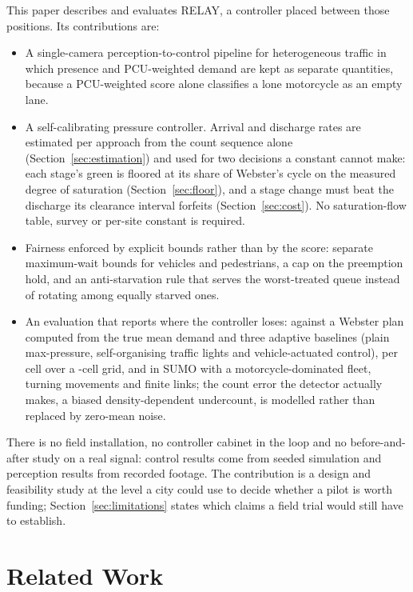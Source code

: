 \documentclass[journal]{IEEEtran}
\newcommand{\relay}{RELAY}
\newcommand{\pcu}{PCU}
\begin{document}
This paper describes and evaluates \relay, a controller placed between those positions. Its contributions are:
\begin{itemize}
\item A single-camera perception-to-control pipeline for heterogeneous traffic in which presence and
\pcu-weighted demand are kept as separate quantities, because a \pcu-weighted score alone classifies a lone
motorcycle as an empty lane.
\item A self-calibrating pressure controller. Arrival and discharge rates are estimated per approach from the
count sequence alone (Section~\ref{sec:estimation}) and used for two decisions a constant cannot make: each
stage's green is floored at its share of Webster's cycle on the measured degree of saturation
(Section~\ref{sec:floor}), and a stage change must beat the discharge its clearance interval forfeits
(Section~\ref{sec:cost}). No saturation-flow table, survey or per-site constant is required.
\item Fairness enforced by explicit bounds rather than by the score: separate maximum-wait bounds for vehicles
and pedestrians, a cap on the preemption hold, and an anti-starvation rule that serves the worst-treated queue
instead of rotating among equally starved ones.
\item An evaluation that reports where the controller loses: against a Webster plan computed from the true
mean demand and three adaptive baselines (plain max-pressure, self-organising traffic lights and
vehicle-actuated control), per cell over a \GridCells-cell grid, and in SUMO with a motorcycle-dominated
fleet, turning movements and finite links; the count error the detector actually makes, a biased
density-dependent undercount, is modelled rather than replaced by zero-mean noise.
\end{itemize}

There is no field installation, no controller cabinet in the loop and
no before-and-after study on a real signal: control results come from seeded simulation and perception results
from recorded footage. The contribution is a design and feasibility study at the level a city could use to
decide whether a pilot is worth funding; Section~\ref{sec:limitations} states which claims a field trial
would still have to establish.

\section{Related Work}
\end{document}
